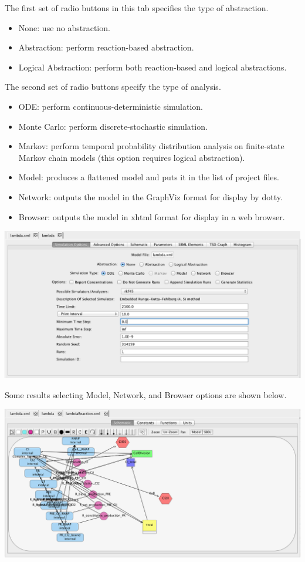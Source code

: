 \documentclass[titlepage,11pt]{article}
\begin{document}
\noindent
The first set of radio buttons in this tab specifies the type of abstraction. 
\begin{itemize}
\item None: use no abstraction.
\item Abstraction: perform reaction-based abstraction.
\item Logical Abstraction: perform both reaction-based and logical abstractions.
\end{itemize}
The second set of radio buttons specify the type of analysis.  
\begin{itemize}
\item ODE: perform continuous-deterministic simulation.
\item Monte Carlo: perform discrete-stochastic simulation.
\item Markov: perform temporal probability distribution analysis on finite-state Markov chain models (this option requires logical abstraction).
\item Model: produces a flattened model and puts it in the list of project files.
\item Network: outputs the model in the GraphViz format for display by dotty.
\item Browser: outputs the model in xhtml format for display in a web browser.
\end{itemize}

\begin{center}
\includegraphics[width=160mm]{screenshots/analysisView}
\end{center}
 
Some results selecting Model, Network, and Browser options are shown below.

\begin{center}
\includegraphics[width=160mm]{screenshots/reactionModel}
\end{center}
\end{document}
